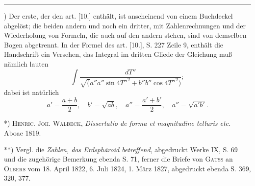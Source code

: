 \par\smallskip\noindent\rule{.25\linewidth}{.4pt}\par
{\small
\par\indent *) Der erste, der den art. [10.] enthält, ist anscheinend von einem Buchdeckel abgelöst; die beiden andern und noch ein dritter, mit Zahlenrechnungen und der Wiederholung von Formeln, die auch auf den andern stehen, sind von demselben Bogen abgetrennt. In der Formel des art. [10.], S. 227 Zeile 9, enthält die Handschrift ein Versehen, das Integral im dritten Gliede der Gleichung muß nämlich lauten
\[\int\frac{dT''}{\surd(a''a''\sin4T''^2+b''b''\cos4T''^2)};\]
\noindent dabei ist natürlich
\[a'=\frac{a+b}2,\quad b'=\sqrt{ab},\quad a''=\frac{a'+b'}2,\quad a''=\sqrt{a'b'}.\]
\par\indent **) \textsc{Henric. Joh. Walbeck}, \textit{Dissertatio de forma et magnitudine telluris etc.} Aboae 1819.
\par\indent ***) Vergl. die \textit{Zahlen, das Erdsphäroid betreffend}, abgedruckt Werke IX, S. 69 und die zugehörige Bemerkung ebenda S. 71, ferner die Briefe von \textsc{Gauss} an \textsc{Olbers} vom 18. April 1822, 6. Juli 1824, 1. März 1827, abgedruckt ebenda S. 369, 320, 377.
\par}
\clearpage
\endgroup
